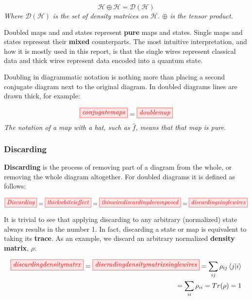 \documentclass[]{article}
\begin{document}
\begin{equation}
\mathcal{H} \oplus \mathcal{H} = \mathcal{D}(\mathcal{H})
\end{equation}
\textit{Where $\mathcal{D}(\mathcal{H})$ is the set of density matrices on $\mathcal{H}$. $\oplus$ is the tensor product.}

Doubled maps and and states represent \textbf{pure} maps and states. Single maps and states represent their \textbf{mixed} counterparts. The most intuitive interpretation, and how it is mostly used in this report, is that the single wires represent classical data and thick wires represent data encoded into a quantum state.

Doubling in diagrammatic notation is nothing more than placing a second conjugate diagram next to the original diagram. In doubled diagrams lines are drawn thick, for example:

\begin{equation}
\tikzfig{conjugatemaps} = \tikzfig{doublemap}
\end{equation}
\textit{The notation of a map with a hat, such as $\hat{f}$, means that that map is pure.}


\subsubsection{Discarding}
\label{discarding}

\textbf{Discarding} is the process of removing part of a diagram from the whole, or removing the whole diagram altogether. For doubled diagrams it is defined as follows:

\begin{equation}
\label{discarding}
\tikzfig{Discarding} = \tikzfig{thickwhiteieffect} = \tikzfig{thinwirediscardingdecomposed} = \tikzfig{discardingsinglewires} 
\end{equation}

It is trivial to see that applying discarding to any arbitrary (normalized) state always results in the number 1. In fact, discarding a state or map is equivalent to taking its \textbf{trace}. As an example, we discard an arbitrary normalized \textbf{density matrix}, $\rho$:

\begin{equation}
\begin{split}
\tikzfig{discardingdensitymatrx} = \tikzfig{discradingdensitymatrixsinglewires} = \sum\limits_{ij} \rho_{ij} \bra{j}\ket{i} \\ = \sum\limits_{ii} \rho_{ii} = Tr(\rho) = 1
\end{split}
\end{equation}
\end{document}
